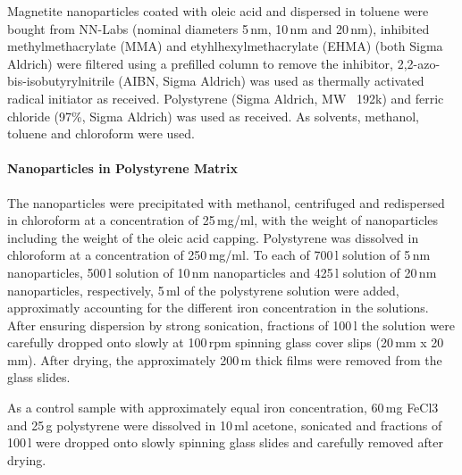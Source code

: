 Magnetite nanoparticles coated with oleic acid and dispersed in toluene were bought from NN-Labs (nominal diameters 5\,nm, 10\,nm and 20\,nm), inhibited methylmethacrylate (MMA) and etyhlhexylmethacrylate (EHMA)  (both Sigma Aldrich) were filtered using a prefilled column to remove the inhibitor,  2,2-azo-bis-isobutyrylnitrile (AIBN, Sigma Aldrich) was used as thermally activated radical initiator as received. Polystyrene (Sigma Aldrich, MW ~192k) and ferric chloride (97\%, Sigma Aldrich) was used as received. As solvents, methanol, toluene and chloroform were used.
\paragraph{Nanoparticles in Polystyrene Matrix} 
The nanoparticles were precipitated with methanol, centrifuged and redispersed in chloroform at a concentration of 25\,mg/ml, with the weight of nanoparticles including the weight of the oleic acid capping. Polystyrene was dissolved in chloroform at a concentration of 250\,mg/ml. 
To each of 700\,\textmu l solution of 5\,nm nanoparticles, 500\,\textmu l solution of 10\,nm nanoparticles and 425\,\textmu l solution of 20\,nm nanoparticles, respectively, 5\,ml of the polystyrene solution were added, approximatly accounting for the different iron concentration in the solutions.  After ensuring dispersion by strong sonication, fractions of 100\,\textmu l the solution were carefully dropped onto slowly at 100\,rpm spinning glass cover slips (20\,mm x 20\,mm). After drying, the approximately 200\,\textmu m thick films were removed from the glass slides.

As a control sample with approximately equal iron concentration, 60\,mg FeCl3 and 25\,g polystyrene were dissolved in 10\,ml acetone, sonicated and  fractions of 100\,\textmu l were dropped onto slowly spinning glass slides  and carefully removed after drying.

